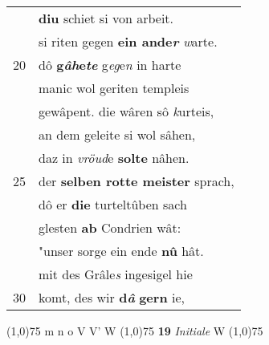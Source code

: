 \documentclass[8pt,a4paper,notitlepage]{article}
\begin{document}
\begin{table}[ht]
\begin{minipage}[t]{0.5\linewidth}
\begin{tabular}{rl}
 & \textbf{diu} schiet si von arbeit.\\ 
 & si riten gegen \textbf{ein ande\textit{r}} \textit{w}arte.\\ 
20 & dô \textbf{g\textit{âh}e\textit{te}} g\textit{eg}e\textit{n} in harte\\ 
 & manic wol geriten templeis\\ 
 & gewâpent. die wâren sô \textit{k}urteis,\\ 
 & an dem geleite si wol sâhen,\\ 
 & daz in \textit{vröud}e \textbf{solte} nâhen.\\ 
25 & der \textbf{selben rotte meister} sprach,\\ 
 & dô er \textbf{die} turteltûben sach\\ 
 & glesten \textbf{ab} Condrien wât:\\ 
 & "unser sorge ein ende \textbf{nû} hât.\\ 
 & mit des Grâle\textit{s} ingesigel hie\\ 
30 & komt, des wir \textbf{d\textit{â}} \textbf{gern} ie,\\ 
\end{tabular}
\scriptsize
\line(1,0){75} \newline
m n o V V' W \newline
\line(1,0){75} \newline
\textbf{19} \textit{Initiale} W  \newline
\line(1,0){75} \newline

\end{minipage}
\end{table}
\end{document}
